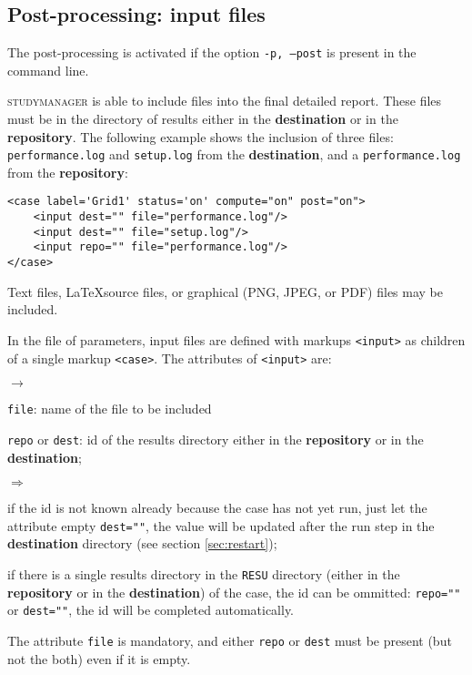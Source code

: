 \documentclass[a4paper,10pt,twoside]{csshortdoc}
\begin{document}
\subsection{Post-processing: input files}\label{sec:input}

The post-processing is activated if the option \texttt{-p, --post} is present
in the command line.

\textsc{studymanager} is able to include files into the final detailed report. These
files must be in the directory of results either in the \textbf{destination} or
in the \textbf{repository}. The following example shows the inclusion of three
files: \texttt{performance.log} and \texttt{setup.log} from the
\textbf{destination}, and a \texttt{performance.log} from the \textbf{repository}:

\small
\begin{verbatim}
<case label='Grid1' status='on' compute="on" post="on">
    <input dest="" file="performance.log"/>
    <input dest="" file="setup.log"/>
    <input repo="" file="performance.log"/>
</case>
\end{verbatim}
\normalsize

Text files, \LaTeX source files, or graphical (PNG, JPEG, or PDF) files
may be included.

In the file of parameters, input files are defined with markups \texttt{<input>}
as children of a single markup \texttt{<case>}.
The attributes of \texttt{<input>} are:
\begin{list}{$\rightarrow$}{}
\item \texttt{file}: name of the file to be included
\item \texttt{repo} or \texttt{dest}: id of the results directory either in the
\textbf{repository} or in the \textbf{destination};
\begin{list}{$\Rightarrow$}{}
\item if the id is not known already because the case has not yet run, just let
the attribute empty \texttt{dest=""}, the value will be updated after the run
step in the \textbf{destination} directory (see section \ref{sec:restart});
\item if there is a single results directory in the \texttt{RESU} directory
(either in the \textbf{repository} or in the \textbf{destination}) of the case,
the id can be ommitted: \texttt{repo=""} or \texttt{dest=""}, the id will be
completed automatically.
\end{list}
\end{list}
The attribute \texttt{file} is mandatory, and either \texttt{repo} or
\texttt{dest} must be present (but not the both) even if it is empty.
\end{document}
